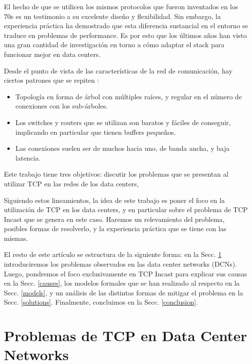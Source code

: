 \documentclass[runningheads,a4paper]{llncs}
\begin{document}
El hecho de que se utilicen los mismos protocolos que fueron inventados en los 70s es un testimonio a su excelente diseño y flexibilidad. Sin embargo, la experiencia práctica ha demostrado que esta diferencia sustancial en el entorno se traduce en problemas de performance. Es por esto que los últimos años han visto una gran cantidad de investigación en torno a cómo adaptar el stack para funcionar mejor en data centers.

Desde el punto de vista de las características de la red de comunicación, hay ciertos patrones que se repiten \cite{Benson_Network_2010}:

\begin{itemize}
\item Topología en forma de árbol con múltiples raíces, y regular en el número de conexiones con los sub-árboles.

\item Los switches y routers que se utilizan son baratos y fáciles de conseguir, implicando en particular que tienen buffers pequeños.

\item Las conexiones suelen ser de muchos hacia uno, de banda ancha, y baja latencia.
\end{itemize}

Este trabajo tiene tres objetivos: discutir los problemas que se presentan al utilizar TCP en las redes de los data centers, 

Siguiendo estos lineamientos, la idea de este trabajo es poner el foco en la utilización de TCP en los data centers, y en particular sobre el problema de TCP Incast que se genera en este caso. Haremos un relevamiento del problema, posibles formas de resolverlo, y la experiencia práctica que se tiene con las mismas.

El resto de este artículo se estructura de la siguiente forma: en la Secc. \ref{problems} introduciremos los problemas observados en las data center networks (DCNs). Luego, pondremos el foco exclusivamente en TCP Incast para explicar sus causas en la Secc. \ref{causes}, los modelos formales que se han realizado al respecto en la Secc. \ref{models}, y un análisis de las distintas formas de mitigar el problema en la Secc. \ref{solutions}. Finalmente, concluimos en la Secc. \ref{conclusion}. 

\section{Problemas de TCP en Data Center Networks} \label{problems}
\end{document}
